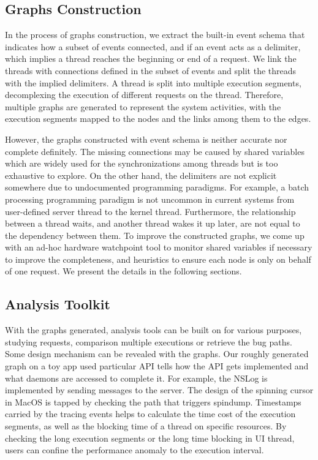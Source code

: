 \subsection{Graphs Construction}
In the process of graphs construction, we extract the built-in event schema that indicates how a subset of events connected, and if an event acts as a delimiter, which implies a thread reaches the beginning or end of a request.
We link the threads with connections defined in the subset of events and split the threads with the implied delimiters.
A thread is split into multiple execution segments, decomplexing the execution of different requests on the thread.
Therefore, multiple graphs are generated to represent the system activities, with the execution segments mapped to the nodes and the links among them to the edges.

However, the graphs constructed with event schema is neither accurate nor complete definitely.
The missing connections may be caused by shared variables which are widely used for the synchronizations among threads but is too exhaustive to explore.
On the other hand, the delimiters are not explicit somewhere due to undocumented programming paradigms.
For example, a batch processing programming paradigm is not uncommon in current systems from user-defined server thread to the kernel thread.
Furthermore, the relationship between a thread waits, and another thread wakes it up later, are not equal to the dependency between them.
To improve the constructed graphs, we come up with an ad-hoc hardware watchpoint tool to monitor shared variables if necessary to improve the completeness, and heuristics to ensure each node is only on behalf of one request.
We present the details in the following sections.

\subsection{Analysis Toolkit}
With the graphs generated, analysis tools can be built on for various purposes, studying requests, comparison multiple executions or retrieve the bug paths.
Some design mechanism can be revealed with the graphs.
Our roughly generated graph on a toy app used particular API tells how the API gets implemented and what daemons are accessed to complete it.
For example, the NSLog is implemented by sending messages to the server.
The design of the spinning cursor in MacOS is tapped by checking the path that triggers spindump.
Timestamps carried by the tracing events helps to calculate the time cost of the execution segments, as well as the blocking time of a thread on specific resources.
By checking the long execution segments or the long time blocking in UI thread, users can confine the performance anomaly to the execution interval.
